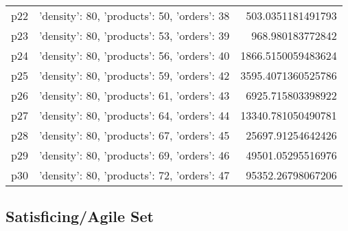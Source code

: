 \documentclass{article}
\begin{document}
\begin{center}
\begin{tabular}{r|r|r}
  p22&{'density': 80, 'products': 50, 'orders': 38}&503.0351181491793\\
  p23&{'density': 80, 'products': 53, 'orders': 39}&968.980183772842\\
  p24&{'density': 80, 'products': 56, 'orders': 40}&1866.5150059483624\\
  p25&{'density': 80, 'products': 59, 'orders': 42}&3595.4071360525786\\
  p26&{'density': 80, 'products': 61, 'orders': 43}&6925.715803398922\\
  p27&{'density': 80, 'products': 64, 'orders': 44}&13340.781050490781\\
  p28&{'density': 80, 'products': 67, 'orders': 45}&25697.91254642426\\
  p29&{'density': 80, 'products': 69, 'orders': 46}&49501.05295516976\\
  p30&{'density': 80, 'products': 72, 'orders': 47}&95352.26798067206
                            \end{tabular}
                            \end{center}
                    

                                \subsection*{Satisficing/Agile Set}
                                
\end{document}
